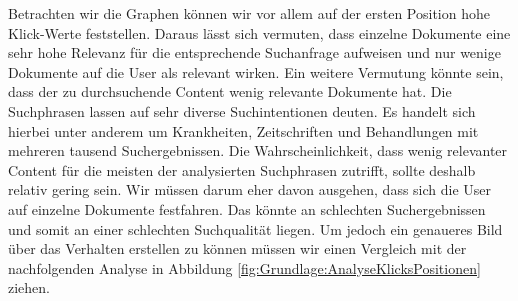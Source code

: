 Betrachten wir die Graphen können wir vor allem auf der ersten Position hohe Klick-Werte feststellen. Daraus lässt sich vermuten, dass einzelne Dokumente eine sehr hohe Relevanz für die entsprechende Suchanfrage aufweisen und nur wenige Dokumente auf die User als relevant wirken. Ein weitere Vermutung könnte sein, dass der zu durchsuchende Content wenig relevante Dokumente hat. Die Suchphrasen lassen auf sehr diverse Suchintentionen deuten. Es handelt sich hierbei unter anderem um Krankheiten, Zeitschriften und Behandlungen mit mehreren tausend Suchergebnissen. Die Wahrscheinlichkeit, dass wenig relevanter Content für die meisten der analysierten Suchphrasen zutrifft, sollte deshalb relativ gering sein. Wir müssen darum eher davon ausgehen, dass sich die User auf einzelne Dokumente festfahren. Das könnte an schlechten Suchergebnissen und somit an einer schlechten Suchqualität liegen. Um jedoch ein genaueres Bild über das Verhalten erstellen zu können müssen wir einen Vergleich mit der nachfolgenden Analyse in Abbildung \ref{fig:Grundlage:AnalyseKlicksPositionen} ziehen.